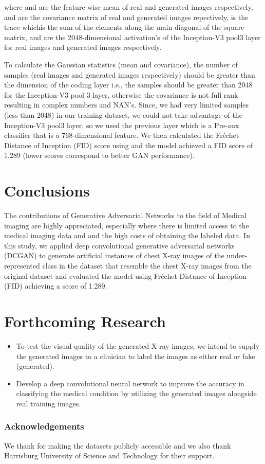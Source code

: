 \documentclass{article}
\begin{document}
where  and  are the feature-wise mean of real and generated images respectively,  and  are the covariance matrix of real and generated images repectively,  is the trace whichis the sum of the elements along the main diagonal of the square matrix,  and  are the 2048-dimensional activation's of the Inception-V3 pool3 layer for real images and generated images respectively. 
\par
To calculate the Gaussian statistics (mean and covariance), the number of samples (real images and generated images respectively) should be greater than the dimension of the coding layer i.e., the samples should be greater than 2048 for the Inception-V3 pool 3 layer, otherwise the covariance is not full rank resulting in complex numbers and NAN's.  Since, we had very limited samples (less than 2048) in our training dataset, we could not take advantage of the Inception-V3 pool3 layer, so we used the previous layer which is a Pre-aux classifier that is a 768-dimensional feature. We then calculated the Fréchet Distance of Inception (FID) score using \cite{pytorchf86:online} and the model achieved a FID score of 1.289 (lower scores correspond to better GAN performance).



\section*{Conclusions}

The contributions of Generative Adversarial Networks to the field of Medical imaging are highly appreciated, especially where there is limited access to the medical imaging data and and the high costs of obtaining  the labeled data. In this study, we applied deep convolutional generative adversarial networks (DCGAN) to generate artificial instances of chest X-ray images of the under-represented class in the dataset that resemble the chest X-ray images from the original dataset and evaluated the model using Fréchet Distance of Inception (FID) achieving a score of 1.289.




\section*{Forthcoming Research}

\begin{itemize}
\item To test the visual quality of the generated X-ray images, we intend to supply the generated images to a clinician to label the images as either real or fake (generated).
\item Develop a deep convolutional neural network to improve the accuracy in classifying the medical condition by utilizing the generated images alongside real training images.
\end{itemize}

\subsubsection*{Acknowledgements}

We thank \cite{kermany2018identifying} for making the datasets publicly accessible and we also thank Harrisburg University of Science and Technology for their support.

  
 
\end{document}
